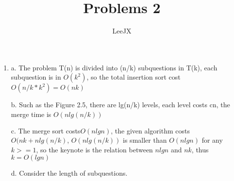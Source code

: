 \documentclass{article}
\title{Problems 2}
\author{LeeJX}
\begin{document}
\maketitle

\begin{enumerate}[\textbf{2-}1]
\item 
\par a. The problem T(n) is divided into (n/k) subquestions in T(k), each subquestion is in $O(k^2)$, so the total insertion sort cost $O(n/k*k^2)=O(nk)$
\par b. Such as the Figure 2.5, there are lg(n/k) levels, each level costs cn, the merge time is $O(nlg(n/k))$
\par c. The merge sort costs$O(nlgn)$, the given algorithm costs$O(nk+nlg(n/k)$, $O(nlg(n/k))$ is smaller than $O(nlgn)$ for any $k>=1$, so the keynote is the relation between $nlgn$ and $nk$, thus $k=O(lgn)$
\par d. Consider the length of subquestions.


\end{enumerate}
\end{document}
